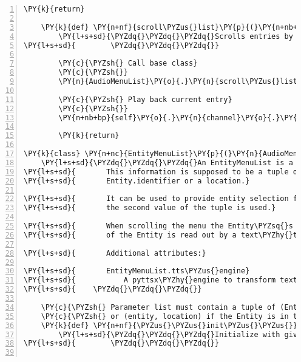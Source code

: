 \begin{Verbatim}[commandchars=\\\{\},numbers=left,firstnumber=1,stepnumber=1]
        \PY{k}{return}

    \PY{k}{def} \PY{n+nf}{scroll\PYZus{}list}\PY{p}{(}\PY{n+nb+bp}{self}\PY{p}{,} \PY{n}{key}\PY{p}{)}\PY{p}{:}
        \PY{l+s+sd}{\PYZdq{}\PYZdq{}\PYZdq{}Scrolls entries by decreasing or increasing the list\PYZus{}index and plays the sound in the list at the current index.}
\PY{l+s+sd}{        \PYZdq{}\PYZdq{}\PYZdq{}}

        \PY{c}{\PYZsh{} Call base class}
        \PY{c}{\PYZsh{}}
        \PY{n}{AudioMenuList}\PY{o}{.}\PY{n}{scroll\PYZus{}list}\PY{p}{(}\PY{n+nb+bp}{self}\PY{p}{,} \PY{n}{key}\PY{p}{)}

        \PY{c}{\PYZsh{} Play back current entry}
        \PY{c}{\PYZsh{}}
        \PY{n+nb+bp}{self}\PY{o}{.}\PY{n}{channel}\PY{o}{.}\PY{n}{play}\PY{p}{(}\PY{n+nb+bp}{self}\PY{o}{.}\PY{n}{list}\PY{p}{[}\PY{n+nb+bp}{self}\PY{o}{.}\PY{n}{list\PYZus{}index}\PY{p}{]}\PY{p}{)}

        \PY{k}{return}

\PY{k}{class} \PY{n+nc}{EntityMenuList}\PY{p}{(}\PY{n}{AudioMenuList}\PY{p}{)}\PY{p}{:}
    \PY{l+s+sd}{\PYZdq{}\PYZdq{}\PYZdq{}An EntityMenuList is a specific AudioMenuList whose list is supposed to contain fabula.Entity information.}
\PY{l+s+sd}{       This information is supposed to be a tuple of Entity, and}
\PY{l+s+sd}{       Entity.identifier or a location.}

\PY{l+s+sd}{       It can be used to provide entity selection for fabula.Events, for which}
\PY{l+s+sd}{       the second value of the tuple is used.}

\PY{l+s+sd}{       When scrolling the menu the Entity\PYZsq{}s identifier or the text/plain asset}
\PY{l+s+sd}{       of the Entity is read out by a text\PYZhy{}to\PYZhy{}speech engine.}

\PY{l+s+sd}{       Additional attributes:}

\PY{l+s+sd}{       EntityMenuList.tts\PYZus{}engine}
\PY{l+s+sd}{           A pyttsx\PYZhy{}engine to transform text to speech.}
\PY{l+s+sd}{    \PYZdq{}\PYZdq{}\PYZdq{}}

    \PY{c}{\PYZsh{} Parameter list must contain a tuple of (Entity, Entity.identifier) if the Entity is in the rack}
    \PY{c}{\PYZsh{} or (entity, location) if the Entity is in the room}
    \PY{k}{def} \PY{n+nf}{\PYZus{}\PYZus{}init\PYZus{}\PYZus{}}\PY{p}{(}\PY{n+nb+bp}{self}\PY{p}{,} \PY{n+nb}{list}\PY{p}{,} \PY{n}{menu\PYZus{}sound}\PY{p}{,} \PY{n}{empty\PYZus{}sound}\PY{p}{,} \PY{n}{channel}\PY{p}{,} \PY{n}{callback\PYZus{}on\PYZus{}entry\PYZus{}selected}\PY{p}{,} \PY{n}{callback\PYZus{}on\PYZus{}exit}\PY{p}{,} \PY{n}{tts\PYZus{}engine}\PY{p}{)}\PY{p}{:}
        \PY{l+s+sd}{\PYZdq{}\PYZdq{}\PYZdq{}Initialize with given parameters.}
\PY{l+s+sd}{        \PYZdq{}\PYZdq{}\PYZdq{}}


\end{Verbatim}
